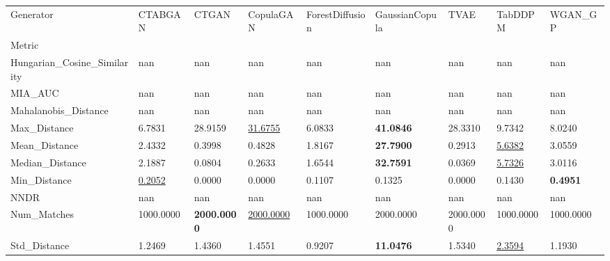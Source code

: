 \begin{tabular}{lllllllll}
\toprule
Generator & CTABGAN & CTGAN & CopulaGAN & ForestDiffusion & GaussianCopula & TVAE & TabDDPM & WGAN_GP \\
Metric &  &  &  &  &  &  &  &  \\
\midrule
Hungarian_Cosine_Similarity & nan & nan & nan & nan & nan & nan & nan & nan \\
MIA_AUC & nan & nan & nan & nan & nan & nan & nan & nan \\
Mahalanobis_Distance & nan & nan & nan & nan & nan & nan & nan & nan \\
Max_Distance & 6.7831 & 28.9159 & \underline{31.6755} & 6.0833 & \textbf{41.0846} & 28.3310 & 9.7342 & 8.0240 \\
Mean_Distance & 2.4332 & 0.3998 & 0.4828 & 1.8167 & \textbf{27.7900} & 0.2913 & \underline{5.6382} & 3.0559 \\
Median_Distance & 2.1887 & 0.0804 & 0.2633 & 1.6544 & \textbf{32.7591} & 0.0369 & \underline{5.7326} & 3.0116 \\
Min_Distance & \underline{0.2052} & 0.0000 & 0.0000 & 0.1107 & 0.1325 & 0.0000 & 0.1430 & \textbf{0.4951} \\
NNDR & nan & nan & nan & nan & nan & nan & nan & nan \\
Num_Matches & 1000.0000 & \textbf{2000.0000} & \underline{2000.0000} & 1000.0000 & 2000.0000 & 2000.0000 & 1000.0000 & 1000.0000 \\
Std_Distance & 1.2469 & 1.4360 & 1.4551 & 0.9207 & \textbf{11.0476} & 1.5340 & \underline{2.3594} & 1.1930 \\
\bottomrule
\end{tabular}
